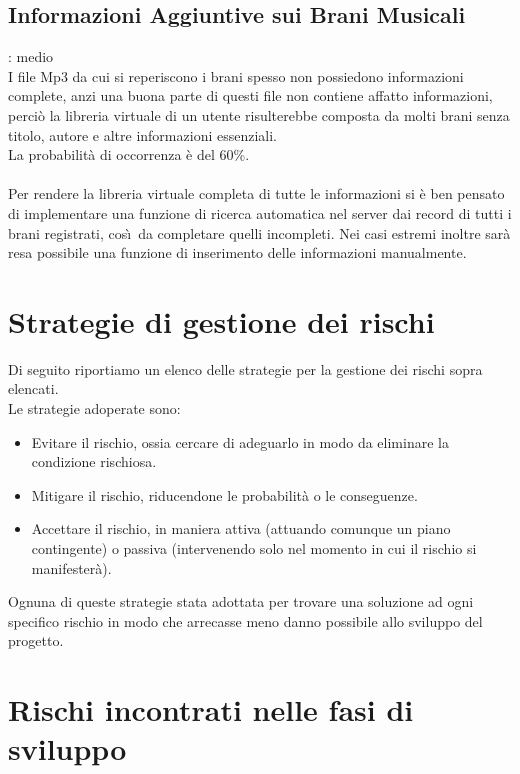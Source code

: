 \subsection{Informazioni Aggiuntive sui Brani Musicali}
: medio\\
I file Mp3 da cui si reperiscono i brani spesso non possiedono informazioni
complete, anzi una buona parte di questi file non contiene affatto informazioni, perci\`o la libreria virtuale 
di un utente risulterebbe composta da molti brani senza titolo, autore e altre
informazioni essenziali.\\
La probabilit\`a di occorrenza \`e del 60\%.\\
\\
Per rendere la libreria virtuale completa di tutte le informazioni si \`e ben pensato di implementare una 
funzione di ricerca automatica nel server dai record di tutti i brani registrati, cos\`\i\ da completare 
quelli incompleti. Nei casi estremi inoltre sar\`a resa possibile una funzione
di inserimento delle informazioni manualmente.

\section{Strategie di gestione dei rischi}

Di seguito riportiamo un elenco delle strategie per la gestione dei rischi sopra
elencati.\\

Le strategie adoperate sono:
\begin{itemize}
	\item Evitare il rischio, ossia cercare di adeguarlo in modo da eliminare la
	condizione rischiosa. 
	\item Mitigare il rischio, riducendone le probabilit\`a o le conseguenze.
	\item Accettare il rischio, in maniera attiva (attuando comunque un piano
	contingente) o passiva (intervenendo solo nel momento in cui il rischio si
	manifester\`a).
\end{itemize}

Ognuna di queste strategie  stata adottata per trovare una soluzione
ad ogni specifico rischio in modo che arrecasse meno danno possibile allo
sviluppo del progetto.\\

\section{Rischi incontrati nelle fasi di sviluppo}

